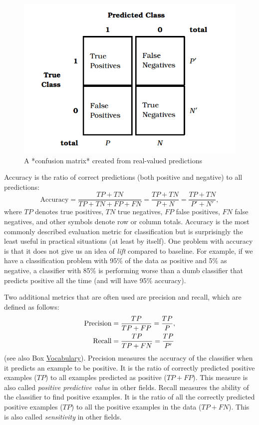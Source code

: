\documentclass[]{krantz}
\begin{document}
\begin{figure}

{\centering \includegraphics[width=0.7\linewidth]{ChapterML/figures/cm} 

}

\caption{A *confusion matrix* created from real-valued predictions}\label{fig:cm}
\end{figure}

Accuracy is the ratio of correct predictions (both positive and
negative) to all predictions:
\[\textrm{Accuracy}=\frac{TP + TN}{TP + TN + FP + FN}=\frac{TP + TN}{P+N}=\frac{TP + TN}{P'+N'},\]
where \(TP\) denotes true positives, \(TN\) true negatives, \(FP\) false
positives, \(FN\) false negatives, and other symbols denote row or
column totals. Accuracy is the most commonly described evaluation metric
for classification but is surprisingly the least useful in practical
situations (at least by itself). One problem with accuracy is that it
does not give us an idea of \emph{lift} compared to baseline. For
example, if we have a classification problem with 95\% of the data as
positive and 5\% as negative, a classifier with 85\% is performing worse
than a dumb classifier that predicts positive all the time (and will
have 95\% accuracy).

Two additional metrics that are often used are precision and recall,
which are defined as follows: \[\begin{aligned}
{\rm Precision} &= \frac{TP}{TP + FP}=\frac{TP}{P},
\\
{\rm Recall} &= \frac{TP}{TP + FN}=\frac{TP}{P'}
\end{aligned}\] (see also Box \protect\hyperlink{box:ml3}{Vocabulary}).
Precision measures the accuracy of the classifier when it predicts an
example to be positive. It is the ratio of correctly predicted positive
examples (\(TP\)) to all examples predicted as positive (\(TP + FP\)).
This measure is also called \emph{positive predictive value} in other
fields. Recall measures the ability of the classifier to find positive
examples. It is the ratio of all the correctly predicted positive
examples (\(TP\)) to all the positive examples in the data
(\(TP + FN\)). This is also called \emph{sensitivity} in other fields.
\end{document}
